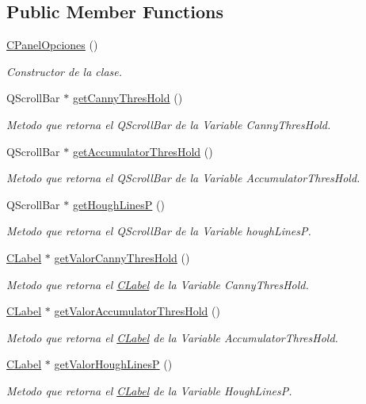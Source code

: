 \subsection*{Public Member Functions}
\begin{DoxyCompactItemize}
\item 
\hyperlink{classCPanelOpciones_ad187a964b9ac72e6571ca699035195a3}{C\+Panel\+Opciones} ()
\begin{DoxyCompactList}\small\item\em Constructor de la clase. \end{DoxyCompactList}\item 
Q\+Scroll\+Bar $\ast$ \hyperlink{classCPanelOpciones_a69b8584e61b0fbd7a86c9b4b1af4fd60}{get\+Canny\+Thres\+Hold} ()
\begin{DoxyCompactList}\small\item\em Metodo que retorna el Q\+Scroll\+Bar de la Variable Canny\+Thres\+Hold. \end{DoxyCompactList}\item 
Q\+Scroll\+Bar $\ast$ \hyperlink{classCPanelOpciones_adefbced180846a9e7443aa6063ea39f8}{get\+Accumulator\+Thres\+Hold} ()
\begin{DoxyCompactList}\small\item\em Metodo que retorna el Q\+Scroll\+Bar de la Variable Accumulator\+Thres\+Hold. \end{DoxyCompactList}\item 
Q\+Scroll\+Bar $\ast$ \hyperlink{classCPanelOpciones_a26734902c1b8c353c83c6b3530be3c47}{get\+Hough\+LinesP} ()
\begin{DoxyCompactList}\small\item\em Metodo que retorna el Q\+Scroll\+Bar de la Variable hough\+LinesP. \end{DoxyCompactList}\item 
\hyperlink{classCLabel}{C\+Label} $\ast$ \hyperlink{classCPanelOpciones_a65fee0477e988937ea93176f04657388}{get\+Valor\+Canny\+Thres\+Hold} ()
\begin{DoxyCompactList}\small\item\em Metodo que retorna el \hyperlink{classCLabel}{C\+Label} de la Variable Canny\+Thres\+Hold. \end{DoxyCompactList}\item 
\hyperlink{classCLabel}{C\+Label} $\ast$ \hyperlink{classCPanelOpciones_a0f051efb1549353b79966471bc6b656f}{get\+Valor\+Accumulator\+Thres\+Hold} ()
\begin{DoxyCompactList}\small\item\em Metodo que retorna el \hyperlink{classCLabel}{C\+Label} de la Variable Accumulator\+Thres\+Hold. \end{DoxyCompactList}\item 
\hyperlink{classCLabel}{C\+Label} $\ast$ \hyperlink{classCPanelOpciones_aae4983463e8d5e2d07fc93bee488af0b}{get\+Valor\+Hough\+LinesP} ()
\begin{DoxyCompactList}\small\item\em Metodo que retorna el \hyperlink{classCLabel}{C\+Label} de la Variable Hough\+LinesP. \end{DoxyCompactList}\end{DoxyCompactItemize}
